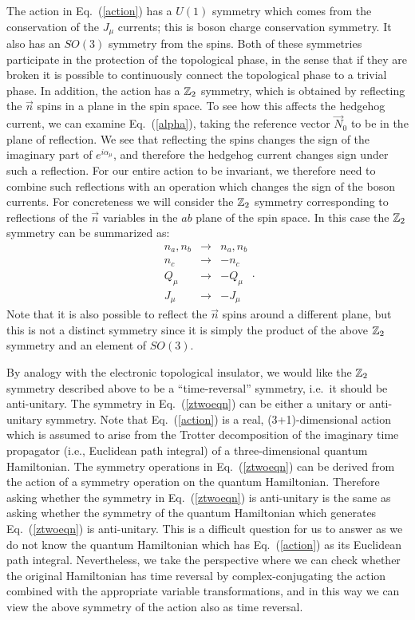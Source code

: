 The action in Eq.~(\ref{action}) has a $U(1)$ symmetry which comes from the conservation of the $J_\mu$ currents; this is boson charge conservation symmetry. It also has an $SO(3)$ symmetry from the spins. Both of these symmetries participate in the protection of the topological phase, in the sense that if they are broken it is possible to continuously connect the topological phase to a trivial phase.
In addition, the action has a $\mathbb{Z}_2$ symmetry, which is obtained by reflecting the $\vec{n}$ spins in a plane in the spin space. To see how this affects the hedgehog current, we can examine Eq.~(\ref{alpha}), taking the reference vector $\vec{N}_0$ to be in the plane of reflection. We see that reflecting the spins changes the sign of the imaginary part of $e^{i\alpha_\mu}$, and therefore the hedgehog current changes sign under such a reflection. For our entire action to be invariant, we therefore need to combine such reflections with an operation which changes the sign of the boson currents. For concreteness we will consider the $\mathbb{Z}_2$ symmetry corresponding to reflections of the $\vec{n}$ variables in the $ab$ plane of the spin space. In this case the $\mathbb{Z}_2$ symmetry can be summarized as:
\begin{equation}
\begin{array}{ccc}
n_a,n_b & \rightarrow & n_a,n_b \\
n_c & \rightarrow & -n_c\\
Q_\mu & \rightarrow & -Q_\mu\\
J_\mu & \rightarrow & -J_\mu 
\end{array}.
\label{ztwoeqn}
\end{equation}
Note that it is also possible to reflect the $\vec n$ spins around a different plane, but this is not a distinct symmetry since it is simply the product of the above $\mathbb{Z}_2$ symmetry and an element of $SO(3)$. 

By analogy with the electronic topological insulator, we would like the $\mathbb{Z}_2$ symmetry described above to be a ``time-reversal'' symmetry, i.e.~it should be anti-unitary. The symmetry in Eq.~(\ref{ztwoeqn}) can be either a unitary or anti-unitary symmetry. Note that Eq.~(\ref{action}) is a real, (3+1)-dimensional action which is assumed to arise from the Trotter decomposition of the imaginary time propagator (i.e., Euclidean path integral) of a three-dimensional quantum Hamiltonian. The symmetry operations in Eq.~(\ref{ztwoeqn}) can be derived from the action of a symmetry operation on the quantum Hamiltonian. Therefore asking whether the symmetry in Eq.~(\ref{ztwoeqn}) is anti-unitary is the same as asking whether the symmetry of the quantum Hamiltonian which generates Eq.~(\ref{ztwoeqn}) is anti-unitary. This is a difficult question for us to answer as we do not know the quantum Hamiltonian which has Eq.~(\ref{action}) as its Euclidean path integral.  Nevertheless, we take the perspective where we can check whether the original Hamiltonian has time reversal by complex-conjugating the action combined with the appropriate variable transformations, and in this way we can view the above symmetry of the action also as time reversal.

